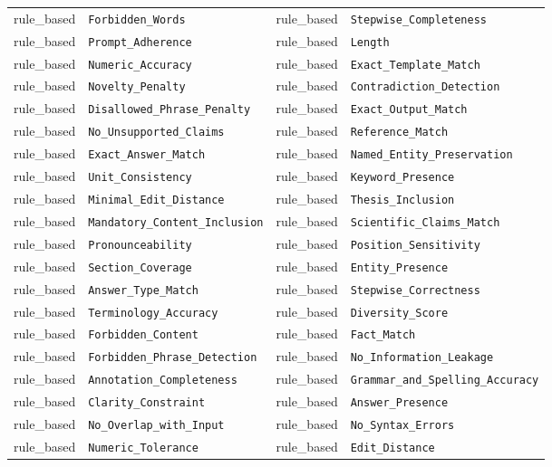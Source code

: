 {\begin{longtable}{|l|l|l|l|}
rule\_based & \texttt{Forbidden\_Words} & rule\_based & \texttt{Stepwise\_Completeness} \\
rule\_based & \texttt{Prompt\_Adherence} & rule\_based & \texttt{Length} \\
rule\_based & \texttt{Numeric\_Accuracy} & rule\_based & \texttt{Exact\_Template\_Match} \\
rule\_based & \texttt{Novelty\_Penalty} & rule\_based & \texttt{Contradiction\_Detection} \\
rule\_based & \texttt{Disallowed\_Phrase\_Penalty} & rule\_based & \texttt{Exact\_Output\_Match} \\
rule\_based & \texttt{No\_Unsupported\_Claims} & rule\_based & \texttt{Reference\_Match} \\
rule\_based & \texttt{Exact\_Answer\_Match} & rule\_based & \texttt{Named\_Entity\_Preservation} \\
rule\_based & \texttt{Unit\_Consistency} & rule\_based & \texttt{Keyword\_Presence} \\
rule\_based & \texttt{Minimal\_Edit\_Distance} & rule\_based & \texttt{Thesis\_Inclusion} \\
rule\_based & \texttt{Mandatory\_Content\_Inclusion} & rule\_based & \texttt{Scientific\_Claims\_Match} \\
rule\_based & \texttt{Pronounceability} & rule\_based & \texttt{Position\_Sensitivity} \\
rule\_based & \texttt{Section\_Coverage} & rule\_based & \texttt{Entity\_Presence} \\
rule\_based & \texttt{Answer\_Type\_Match} & rule\_based & \texttt{Stepwise\_Correctness} \\
rule\_based & \texttt{Terminology\_Accuracy} & rule\_based & \texttt{Diversity\_Score} \\
rule\_based & \texttt{Forbidden\_Content} & rule\_based & \texttt{Fact\_Match} \\
rule\_based & \texttt{Forbidden\_Phrase\_Detection} & rule\_based & \texttt{No\_Information\_Leakage} \\
rule\_based & \texttt{Annotation\_Completeness} & rule\_based & \texttt{Grammar\_and\_Spelling\_Accuracy} \\
rule\_based & \texttt{Clarity\_Constraint} & rule\_based & \texttt{Answer\_Presence} \\
rule\_based & \texttt{No\_Overlap\_with\_Input} & rule\_based & \texttt{No\_Syntax\_Errors} \\
rule\_based & \texttt{Numeric\_Tolerance} & rule\_based & \texttt{Edit\_Distance} \\

\end{longtable}}
